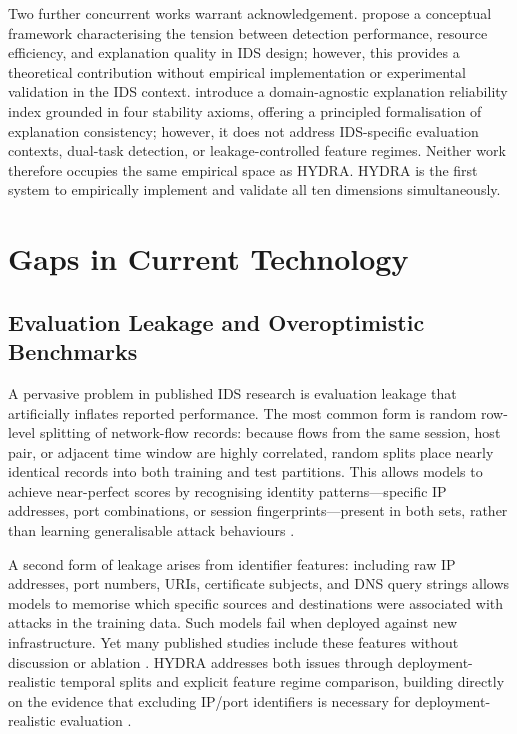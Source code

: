 \documentclass[12pt,a4paper]{report}
\begin{document}
Two further concurrent works warrant acknowledgement. \citet{adadi2018} propose a conceptual framework characterising the tension between detection performance, resource efficiency, and explanation quality in IDS design; however, this provides a theoretical contribution without empirical implementation or experimental validation in the IDS context. \citet{sengupta2026} introduce a domain-agnostic explanation reliability index grounded in four stability axioms, offering a principled formalisation of explanation consistency; however, it does not address IDS-specific evaluation contexts, dual-task detection, or leakage-controlled feature regimes. Neither work therefore occupies the same empirical space as HYDRA. HYDRA is the first system to empirically implement and validate all ten dimensions simultaneously.

\section{Gaps in Current Technology}
\label{sec:gaps}

\subsection{Evaluation Leakage and Overoptimistic Benchmarks}
\label{sec:leakage-gap}

A pervasive problem in published IDS research is evaluation leakage that artificially inflates reported performance. The most common form is random row-level splitting of network-flow records: because flows from the same session, host pair, or adjacent time window are highly correlated, random splits place nearly identical records into both training and test partitions. This allows models to achieve near-perfect scores by recognising identity patterns---specific IP addresses, port combinations, or session fingerprints---present in both sets, rather than learning generalisable attack behaviours \citep{lanvin2022}.

A second form of leakage arises from identifier features: including raw IP addresses, port numbers, URIs, certificate subjects, and DNS query strings allows models to memorise which specific sources and destinations were associated with attacks in the training data. Such models fail when deployed against new infrastructure. Yet many published studies include these features without discussion or ablation \citep{ferrag2022}. HYDRA addresses both issues through deployment-realistic temporal splits and explicit feature regime comparison, building directly on the evidence that excluding IP/port identifiers is necessary for deployment-realistic evaluation \citep{ferrag2022,alsaedi2020}.
\end{document}
